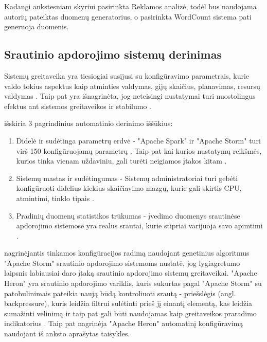 \documentclass{VUMIFPSbakalaurinis}
\begin{document}
Kadangi ankstesniam skyriui pasirinkta Reklamos analizė, todėl bus naudojama autorių pateiktas duomenų generatorius, o pasirinkta WordCount sistema pati generuoja duomenis.

\subsection{Srautinio apdorojimo sistemų derinimas}
Sistemų greitaveika yra tiesiogiai susijusi su konfigūravimo parametrais, kurie valdo tokius aspektus kaip atminties valdymas, gijų skaičius, planavimas, resursų valdymas \cite{lu2019speedup}. Taip pat yra išnagrinėta, jog neteisingi nustatymai turi nuostolingus efektus ant sistemos greitaveikos ir stabilumo \cite{herodotou2011starfish}. 

\cite{herodotou2020survey} išskiria 3 pagrindinius automatinio derinimo iššūkius:
\begin{enumerate}
    \item Didelė ir sudėtinga parametrų erdvė - "Apache Spark" ir "Apache Storm" turi virš 150 konfigūruojamų parametrų \cite{Bilal2017Towards, petridis2016spark}. Taip pat kai kurios nustatymų reikšmės, kurios tinka vienam uždaviniu, gali turėti neigiamos įtakos kitam \cite{herodotou2011starfish, Pooyan2016Uncertainty}.
    \item Sistemų mastas ir sudėtingumas - Sistemų administratoriai turi gebėti konfigūruoti didelius kiekius skaičiavimo mazgų, kurie gali skirtis CPU, atmintimi, tinklo tipais \cite{herodotou2020survey}.
    \item Pradinių duomenų statistikos trūkumas - įvedimo duomenys srautinėse apdorojimo sistemose yra realus srautai, kurie stipriai varijuoja savo apimtimi \cite{Dayarathna2018Recent}.
\end{enumerate}  

\cite{Trotter2017Into} nagrinėjantis tinkamos konfigūracijos radimą naudojant genetinius algoritmus "Apache Storm" srautinio apdorojimo sistemoms nustatė, jog lygiagretumo laipsnis labiausiai daro įtaką srautinio apdorojimo sistemų greitaveikai. 
"Apache Heron" yra srautinio apdorojimo variklis, kuris sukurtas pagal "Apache Storm" su patobulinimais \cite{twitterHeron} pateikia naują būdą kontroliuoti srautą - priešslėgis (angl. backpressure), kuris leidžia filtrui sulėtinti prieš jį einantį elementą, kas leidžia sumažinti vėlinimą ir taip pat gali būti naudojamas kaip greitaveikos praradimo indikatorius \cite{bansal2018trevor}.
Taip pat \cite{bansal2018trevor} nagrinėja "Apache Heron" automatinį konfigūravimą naudojant iš anksto aprašytas taisykles. 
\end{document}
